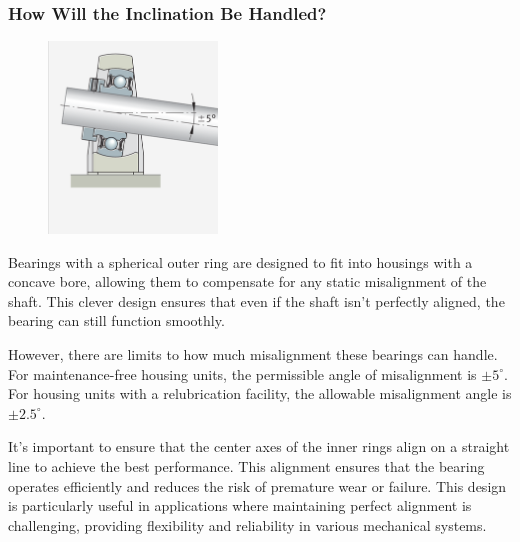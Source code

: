 \documentclass[../../main]{subfiles}
\begin{document}
\subsubsection{How Will the Inclination Be Handled?}
\begin{figure}[h!]
  \centering
  \includegraphics[width=0.4\textwidth]{img/Picture4.png}
  \caption{}
  \end{figure}

  Bearings with a spherical outer ring are designed to fit into housings with a concave bore, allowing them to compensate for any static misalignment of the shaft. This clever design ensures that even if the shaft isn't perfectly aligned, the bearing can still function smoothly.

However, there are limits to how much misalignment these bearings can handle. For maintenance-free housing units, the permissible angle of misalignment is $\pm 5^\circ$. For housing units with a relubrication facility, the allowable misalignment angle is $\pm 2.5^\circ$.

It's important to ensure that the center axes of the inner rings align on a straight line to achieve the best performance. This alignment ensures that the bearing operates efficiently and reduces the risk of premature wear or failure. This design is particularly useful in applications where maintaining perfect alignment is challenging, providing flexibility and reliability in various mechanical systems.
\end{document}
